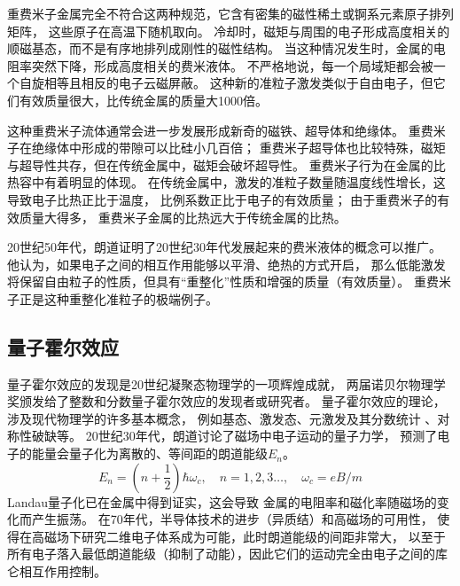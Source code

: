 \documentclass{article}
\begin{document}
重费米子金属完全不符合这两种规范，它含有密集的磁性稀土或锕系元素原子排列矩阵，
这些原子在高温下随机取向。
冷却时，磁矩与周围的电子形成高度相关的顺磁基态，而不是有序地排列成刚性的磁性结构。
当这种情况发生时，金属的电阻率突然下降，形成高度相关的费米液体。
不严格地说，每一个局域矩都会被一个自旋相等且相反的电子云磁屏蔽。
这种新的准粒子激发类似于自由电子，但它们有效质量很大，比传统金属的质量大1000倍。 

这种重费米子流体通常会进一步发展形成新奇的磁铁、超导体和绝缘体。
重费米子在绝缘体中形成的带隙可以比硅小几百倍；
重费米子超导体也比较特殊，磁矩与超导性共存，但在传统金属中，磁矩会破坏超导性。
重费米子行为在金属的比热容中有着明显的体现。
在传统金属中，激发的准粒子数量随温度线性增长，这导致电子比热正比于温度，
比例系数正比于电子的有效质量；
由于重费米子的有效质量大得多，
重费米子金属的比热远大于传统金属的比热。

20世纪50年代，朗道证明了20世纪30年代发展起来的费米液体的概念可以推广。
他认为，如果电子之间的相互作用能够以平滑、绝热的方式开启，
那么低能激发将保留自由粒子的性质，但具有“重整化”性质和增强的质量（有效质量）。
重费米子正是这种重整化准粒子的极端例子。 

\subsection{量子霍尔效应}
量子霍尔效应的发现是20世纪凝聚态物理学的一项辉煌成就，
两届诺贝尔物理学奖颁发给了整数和分数量子霍尔效应的发现者或研究者。
量子霍尔效应的理论，涉及现代物理学的许多基本概念，
例如基态、激发态、元激发及其分数统计 、对称性破缺等。
20世纪30年代，朗道讨论了磁场中电子运动的量子力学，
预测了电子的能量会量子化为离散的、等间距的朗道能级$E_n$。
\begin{equation*}
    E_n=(n+\frac{1}{2})\hbar\omega_c,\quad n=1,2,3\dots,\quad\omega_c=eB/m
\end{equation*}
Landau量子化已在金属中得到证实，这会导致
金属的电阻率和磁化率随磁场的变化而产生振荡。
在70年代，半导体技术的进步（异质结）和高磁场的可用性，
使得在高磁场下研究二维电子体系成为可能，此时朗道能级的间距非常大，
以至于所有电子落入最低朗道能级（抑制了动能），因此它们的运动完全由电子之间的库仑相互作用控制。
\end{document}
